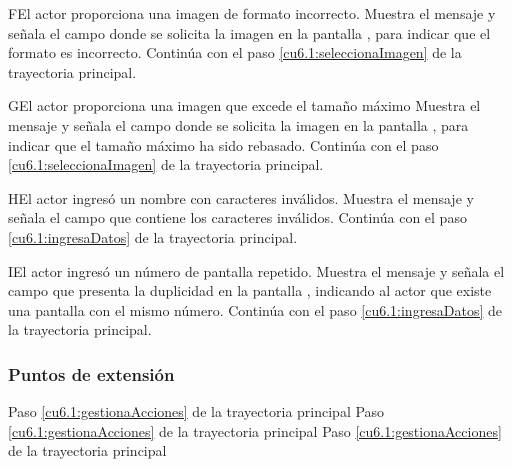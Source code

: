  \begin{UCtrayectoriaA}{F}{El actor proporciona una imagen de formato incorrecto.}
    \UCpaso[\UCsist] Muestra el mensaje  y señala el campo donde se solicita la imagen
    en la pantalla , para indicar que el formato es incorrecto.
    \UCpaso[] Continúa con el paso \ref{cu6.1:seleccionaImagen} de la trayectoria principal.
 \end{UCtrayectoriaA}
 
 \begin{UCtrayectoriaA}{G}{El actor proporciona una imagen que excede el tamaño máximo}
    \UCpaso[\UCsist] Muestra el mensaje  y señala el campo donde se solicita la imagen
    en la pantalla , para indicar que el tamaño máximo ha sido rebasado.
    \UCpaso[] Continúa con el paso \ref{cu6.1:seleccionaImagen} de la trayectoria principal.
 \end{UCtrayectoriaA}
 
 \begin{UCtrayectoriaA}{H}{El actor ingresó un nombre con caracteres inválidos.}
    \UCpaso[\UCsist] Muestra el mensaje  y señala el campo que contiene los caracteres inválidos.
    \UCpaso[] Continúa con el paso \ref{cu6.1:ingresaDatos} de la trayectoria principal.
 \end{UCtrayectoriaA}
 \begin{UCtrayectoriaA}{I}{El actor ingresó un número de pantalla repetido.}
    \UCpaso[\UCsist] Muestra el mensaje  y señala el campo que presenta la duplicidad en la pantalla 
	    , indicando al actor que existe una pantalla con el mismo número.
    \UCpaso[] Continúa con el paso \ref{cu6.1:ingresaDatos} de la trayectoria principal.
 \end{UCtrayectoriaA}
 
\subsubsection{Puntos de extensión}

	{Paso \ref{cu6.1:gestionaAcciones} de la trayectoria principal}
	{}
	{Paso \ref{cu6.1:gestionaAcciones} de la trayectoria principal}
	{}	
	{Paso \ref{cu6.1:gestionaAcciones} de la trayectoria principal}
	{}